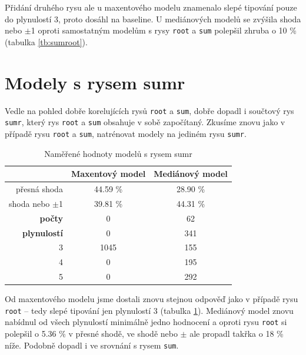 \documentclass[12pt,a4paper]{report}
\begin{document}
Přidání druhého rysu ale u maxentového modelu znamenalo slepé tipování pouze do plynulostí 3, proto dosáhl na baseline. U mediánových modelů se zvýšila shoda nebo $\pm$1 oproti samostatným modelům s rysy \texttt{root} a \texttt{sum} polepšil zhruba o 10 \% (tabulka \ref{tb:sumroot}).





\section{Modely s rysem sumr}
Vedle na pohled dobře korelujících rysů \texttt{root} a \texttt{sum}, dobře dopadl i součtový rys \texttt{sumr}, který rys \texttt{root} a \texttt{sum} obsahuje v sobě započítaný. Zkusíme znovu jako v případě rysu \texttt{root} a \texttt{sum}, natrénovat modely na jediném rysu \texttt{sumr}.

\begin{table}[!htbp]
\begin{center}
\begin{tabular}{|r|c|c|}
\hline
 & \textbf{Maxentový model} & \textbf{Mediánový model} \\
 \hline
 přesná shoda & 44.59 \%  & 28.90 \%  \\
\hline
shoda nebo $\pm$1 & 39.81 \% & 44.31 \%  \\
\hline
     \textbf{počty} \quad 1 & \color{red}0   & \color{OliveGreen}62   \\
\textbf{plynulostí} \quad 2 & \color{red}0 & \color{OliveGreen}341   \\
                          3 & 1045 & \color{OliveGreen}155 \\
                          4 & \color{red}0   & \color{OliveGreen}195 \\
                          5 & \color{red}0   & \color{OliveGreen}292  \\
\hline
\end{tabular}
\caption{Naměřené hodnoty modelů s rysem sumr}\label{tb:sumr}
\end{center}
\end{table}

Od maxentového modelu jsme dostali znovu stejnou odpověď jako v případě rysu \texttt{root} -- tedy slepé tipování jen plynulostí 3 (tabulka \ref{tb:sumr}). Mediánový model znovu nabídnul od všech plynulostí minimálně jedno hodnocení a oproti rysu \texttt{root} si polepšil o 5.36 \% v přesné shodě, ve shodě nebo $\pm$ ale propadl takřka o 18 \% níže. Podobně dopadl i ve srovnání s rysem \texttt{sum}.
\end{document}

